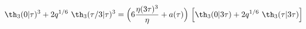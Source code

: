 \begin{equation}
    \th_3(0|\tau)^3 +2 q^{1/6}~\th_3(\tau/3|\tau)^3 = \Big( 6{\eta
    (3\tau)^3 \over\eta} +a(\tau)\Big)~ \Big[\th_3(0|3\tau) +
    2 q^{1/6}~\th_3(\tau|3\tau)\Big]
\end{equation}


